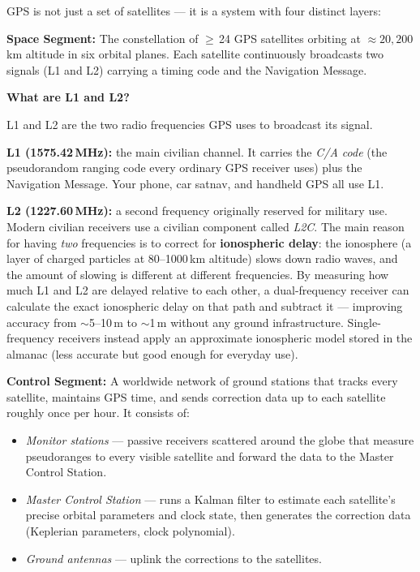 \documentclass[12pt, a4paper]{article}
\begin{document}
GPS is not just a set of satellites --- it is a system with four distinct
layers:

\textbf{Space Segment:} The constellation of $\geq$\,24 GPS satellites
orbiting at $\approx 20{,}200$\,km altitude in six orbital planes.
Each satellite continuously broadcasts two signals (L1 and L2) carrying a
timing code and the Navigation Message.

\begin{notebox}
  \textbf{What are L1 and L2?}

  L1 and L2 are the two radio frequencies GPS uses to broadcast its signal.

  \textbf{L1 (1575.42\,MHz):} the main civilian channel.
  It carries the \emph{C/A code} (the pseudorandom ranging code every
  ordinary GPS receiver uses) plus the Navigation Message.
  Your phone, car satnav, and handheld GPS all use L1.

  \textbf{L2 (1227.60\,MHz):} a second frequency originally reserved for
  military use.
  Modern civilian receivers use a civilian component called \emph{L2C}.
  The main reason for having \emph{two} frequencies is to correct for
  \textbf{ionospheric delay}: the ionosphere (a layer of charged particles
  at 80--1000\,km altitude) slows down radio waves, and the amount of
  slowing is different at different frequencies.
  By measuring how much L1 and L2 are delayed relative to each other, a
  dual-frequency receiver can calculate the exact ionospheric delay on that
  path and subtract it --- improving accuracy from $\sim$5--10\,m to
  $\sim$1\,m without any ground infrastructure.
  Single-frequency receivers instead apply an approximate ionospheric model
  stored in the almanac (less accurate but good enough for everyday use).
\end{notebox}

\textbf{Control Segment:} A worldwide network of ground stations that tracks
every satellite, maintains GPS time, and sends correction data up to each
satellite roughly once per hour.
It consists of:
\begin{itemize}[leftmargin=1.2em, itemsep=2pt]
  \item \emph{Monitor stations} --- passive receivers scattered around the
    globe that measure pseudoranges to every visible satellite and forward the
    data to the Master Control Station.
  \item \emph{Master Control Station} --- runs a Kalman filter to estimate each
    satellite's precise orbital parameters and clock state, then generates the
    correction data (Keplerian parameters, clock polynomial).
  \item \emph{Ground antennas} --- uplink the corrections to the satellites.
\end{itemize}
\end{document}
